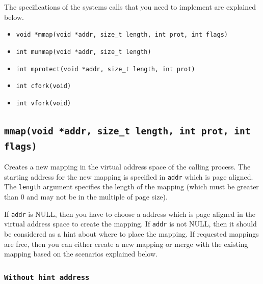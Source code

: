 \documentclass[12pt]{article}
\begin{document}


The specifications of the systems calls that you need to implement are explained below. 

\begin{itemize}
    \item {\tt void *mmap(void *addr, size\_t length, int prot, int flags)}
    \item {\tt int munmap(void *addr, size\_t length)}
    \item {\tt int mprotect(void *addr, size\_t length, int prot)}
    \item {\tt int cfork(void)}
    \item {\tt int vfork(void)}
\end{itemize}



\newpage
\subsection *{\tt mmap(void *addr, size\_t length, int prot, int flags)}

 Creates a new mapping in the virtual address space of the calling process.  The starting address for the new mapping is specified in {\tt addr} which is page aligned. The {\tt length} argument specifies the length of the mapping (which must be greater than 0 and may not be in the multiple of page size).

	If {\tt addr} is NULL, then you have to choose a address which is page aligned in the virtual address space to create the mapping.  If {\tt addr} is not NULL, then it should be considered as a hint about where to place the mapping. If requested mappings are free, then you can either create a new mapping or merge with the existing mapping based on the scenarios explained below.
	
	\subsubsection *{\tt{Without hint address}}
	
\end{document}
